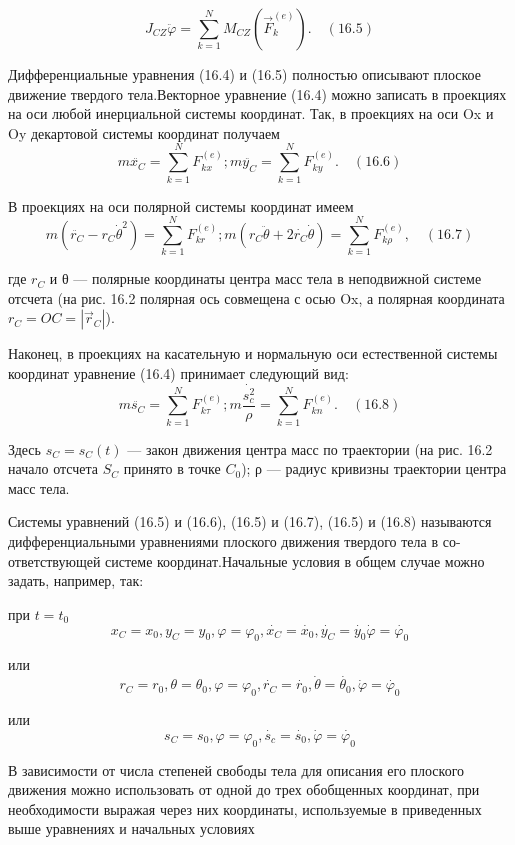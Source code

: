 {\begin{center}
\begin{figure}[H]
    \end{figure} 
        $$J_{CZ}\ddot{\varphi} = \sum_{k=1}^N M_{CZ}(\vec F_k^{(e)}). \quad(16.5)$$
    \par Дифференциальные уравнения (16.4) и (16.5) полностью описывают плоское движение твердого тела.Векторное уравнение (16.4) можно записать в проекциях на оси любой инерциальной системы координат. Так, в проекциях на оси Ox и Oy декартовой системы координат получаем
        $$m\ddot{x_C} = \sum_{k=1}^N F_{kx}^{(e)} ; m\ddot{y_C} = \sum_{k=1}^N F_{ky}^{(e)} . \quad(16.6)$$
    \par В проекциях на оси полярной системы координат имеем
        $$m(\ddot{r_C} - r_C \dot{\theta}^2) = \sum_{k=1}^N F_{kr}^{(e)}; m(r_C\ddot{\theta} + 2\dot{r_C}\dot{\theta}) = \sum_{k=1}^N F_{k\rho}^{(e)}, \quad(16.7)$$
    \par где $r_C$ и θ — полярные координаты центра масс тела в неподвижной системе отсчета (на рис. 16.2 полярная ось совмещена с осью Ox, а полярная координата $r_C = OC = |\vec r_C|$).
    \par Наконец, в проекциях на касательную и нормальную оси естественной системы координат уравнение (16.4) принимает следующий вид:
        $$ m\ddot{s_C} = \sum_{k=1}^N F_{k\tau}^{(e)} ; m\frac{\dot{s_c^2}}{\rho} = \sum_{k=1}^N F_{kn}^{(e)}. \quad(16.8) $$
    \par Здесь $s_C = s_C(t)$ — закон движения центра масс по траектории (на рис. 16.2 начало отсчета $S_C$ принято в точке $C_0$);  ρ — радиус кривизны траектории центра масс тела.
    \par Системы уравнений (16.5) и (16.6), (16.5) и (16.7), (16.5) и (16.8) называются дифференциальными уравнениями плоского движения твердого тела в со-ответствующей системе координат.Начальные  условия  в  общем  случае  можно  задать,  например,  так:  
    \par при $t = t_0$
        $$x_C = x_0, y_C = y_0, \varphi = \varphi_0, \dot{x_C} = \dot{x_0}, \dot{y_C} = \dot{y_0} \dot{\varphi} = \dot{\varphi_0}$$
    \par или
        $$r_C = r_0, \theta = \theta_0, \varphi = \varphi_0, \dot{r_C} = \dot{r_0}, \dot{\theta} = \dot{\theta_0}, \dot{\varphi} = \dot{\varphi_0} $$
    \par или
        $$s_C = s_0, \varphi = \varphi_0, \dot{s_c} = \dot{s_0}, \dot{\varphi} = \dot{\varphi_0}$$
    \par В зависимости от числа степеней свободы тела для описания его плоского движения можно использовать от одной до трех обобщенных координат, при необходимости выражая через них координаты, используемые в приведенных выше уравнениях и начальных условиях   
\end{center}

}
